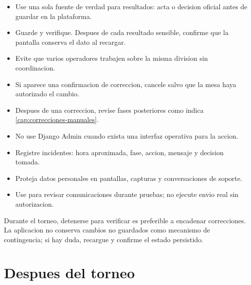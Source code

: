 \begin{itemize}
    \item Use una sola fuente de verdad para resultados: acta o decision oficial antes de guardar en la plataforma.
    \item Guarde y verifique. Despues de cada resultado sensible, confirme que la pantalla conserva el dato al recargar.
    \item Evite que varios operadores trabajen sobre la misma division sin coordinacion.
    \item Si aparece una confirmacion de correccion, cancele salvo que la mesa haya autorizado el cambio.
    \item Despues de una correccion, revise fases posteriores como indica \cref{cap:correcciones-manuales}.
    \item No use Django Admin cuando exista una interfaz operativa para la accion.
    \item Registre incidentes: hora aproximada, fase, accion, mensaje y decision tomada.
    \item Proteja datos personales en pantallas, capturas y conversaciones de soporte.
    \item Use  para revisar comunicaciones durante pruebas; no ejecute envio real sin autorizacion.
\end{itemize}

\begin{operacionsensible}
Durante el torneo, detenerse para verificar es preferible a encadenar correcciones. La aplicacion no conserva cambios no guardados como mecanismo de contingencia; si hay duda, recargue y confirme el estado persistido.
\end{operacionsensible}

\section{Despues del torneo}

